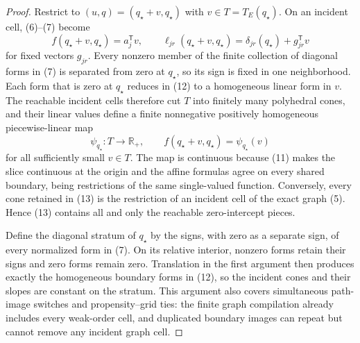 \documentclass{article}
\begin{document}
\begin{proof}
Restrict to \((u,q)=(q_\star+v,q_\star)\) with \(v\in T=T_E(q_\star)\).  On an incident cell, (6)--(7) become
\[
 f(q_\star+v,q_\star)=a_j^{\mathsf T}v,
 \qquad
 \ell_{jr}(q_\star+v,q_\star)
 =\delta_{jr}(q_\star)+g_{jr}^{\mathsf T}v
\tag{12}
\]
for fixed vectors \(g_{jr}\).  Every nonzero member of the finite collection of diagonal forms in (7) is separated from zero at \(q_\star\), so its sign is fixed in one neighborhood.  Each form that is zero at \(q_\star\) reduces in (12) to a homogeneous linear form in \(v\).  The reachable incident cells therefore cut \(T\) into finitely many polyhedral cones, and their linear values define a finite nonnegative positively homogeneous piecewise-linear map
\[
 \psi_{q_\star}:T\longrightarrow\mathbb R_+,
 \qquad
 f(q_\star+v,q_\star)=\psi_{q_\star}(v)
\tag{13}
\]
for all sufficiently small \(v\in T\).  The map is continuous because (11) makes the slice continuous at the origin and the affine formulas agree on every shared boundary, being restrictions of the same single-valued function.  Conversely, every cone retained in (13) is the restriction of an incident cell of the exact graph (5).  Hence (13) contains all and only the reachable zero-intercept pieces.

Define the diagonal stratum of \(q_\star\) by the signs, with zero as a separate sign, of every normalized form in (7).  On its relative interior, nonzero forms retain their signs and zero forms remain zero.  Translation in the first argument then produces exactly the homogeneous boundary forms in (12), so the incident cones and their slopes are constant on the stratum.  This argument also covers simultaneous path-image switches and propensity--grid ties: the finite graph compilation already includes every weak-order cell, and duplicated boundary images can repeat but cannot remove any incident graph cell.


\end{proof}
\end{document}

